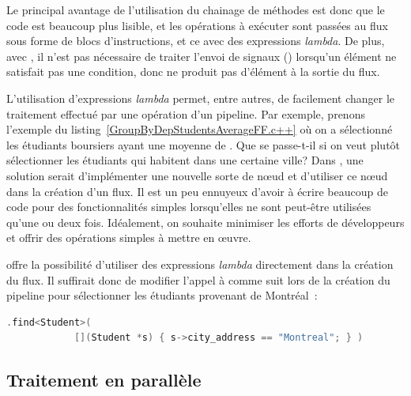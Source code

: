 Le principal avantage de l'utilisation du chainage de m\'ethodes est donc que le code est beaucoup plus lisible, et les op\'erations à exécuter sont pass\'ees au flux sous forme de blocs d'instructions, et ce avec des expressions \emph{lambda}.
%
De plus, avec , il n'est pas nécessaire de traiter l'envoi de
signaux () lorsqu'un élément ne satisfait pas une
condition, donc ne produit pas d'élément à la sortie du flux.






L'utilisation d'expressions \emph{lambda} permet, entre autres, de
facilement changer le traitement effectué par une opération d'un
pipeline.
%
Par exemple, prenons l'exemple du listing~\ref{GroupByDepStudentsAverageFF.c++} o\`u on a sélectionné les \'etudiants boursiers ayant une moyenne de . Que se passe-t-il si on veut plutôt sélectionner les \'etudiants qui habitent dans une certaine ville? Dans , une solution serait d'impl\'ementer une nouvelle sorte de nœud et d'utiliser ce n\oe{}ud dans la cr\'eation d'un flux. 
%
Il est un peu ennuyeux d'avoir \`a \'ecrire beaucoup de code pour des fonctionnalit\'es simples lorsqu'elles ne sont peut-\^etre utilis\'ees qu'une ou deux fois. Id\'ealement, on souhaite minimiser les efforts de d\'eveloppeurs et offrir des op\'erations simples \`a mettre en œuvre.


 offre la possibilit\'e d'utiliser des expressions \emph{lambda} directement dans la cr\'eation du flux.
%
Il suffirait donc de modifier l'appel à  comme suit lors de la création du pipeline pour sélectionner les étudiants provenant de Montréal~: 
{
\begin{lstlisting}[language=c++]
		.find<Student>( 
			[](Student *s) { s->city_address == "Montreal"; } )
\end{lstlisting}
}


\subsection*{Traitement en parall\`ele}

